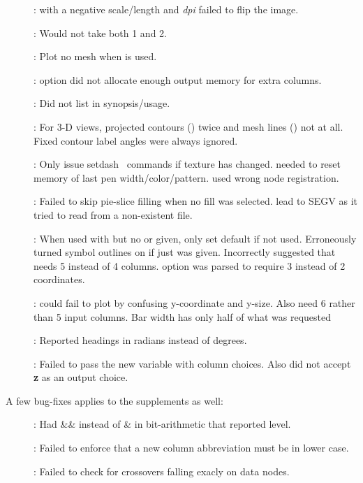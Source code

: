 \begin{description}
\item []:  with a negative scale/length and \emph{dpi} failed to flip the image.
\item []: Would not take both 1 and 2.
\item []: Plot no mesh when  is used.
\item []:  option did not allocate enough output memory for extra columns.
\item []: Did not list  in synopsis/usage.
\item []: For 3-D views,  projected contours () twice and mesh lines () not at all.
Fixed contour label angles were always ignored.
\item []: Only issue setdash \PS\ commands if texture has changed.   needed to
reset memory of last pen width/color/pattern.   used wrong node registration.
\item []: Failed to skip pie-slice filling when no fill was selected.   lead to
SEGV as it tried to read from a non-existent file.
\item []: When used with  but no  or  given, only set default  if  not used.
Erroneously turned symbol outlines on if just  was given.  Incorrectly suggested that  needs 5 instead of 4 columns.
 option was parsed to require 3 instead of 2 coordinates.
\item []:  could fail to plot by confusing y-coordinate and y-size.
Also need 6 rather than 5 input columns.  Bar width has only half of what was requested
\item []: Reported headings in radians instead of degrees.
\item []: Failed to pass the new variable with column choices.
Also did not accept { \bf z} as an output choice.
\end{description}
A few bug-fixes applies to the supplements as well:
\begin{description}
\item []: Had \&\& instead of \& in bit-arithmetic that reported level.
\item []: Failed to enforce that a new column abbreviation must be in lower case.
\item []: Failed to check for crossovers falling exacly on data nodes.
\end{description}

